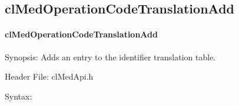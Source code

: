 \begin{flushleft}
\subsection{clMedOperationCodeTranslationAdd}
\hypertarget{pagemed106}{}\paragraph{cl\-Med\-Operation\-Code\-Translation\-Add}\label{pagemed106}
\begin{Desc}
\item[Synopsis:]Adds an entry to the identifier translation table.\end{Desc}
\begin{Desc}
\item[Header File:]clMedApi.h\end{Desc}
\begin{Desc}
\item[Syntax:]


\end{Desc}
\end{flushleft}
